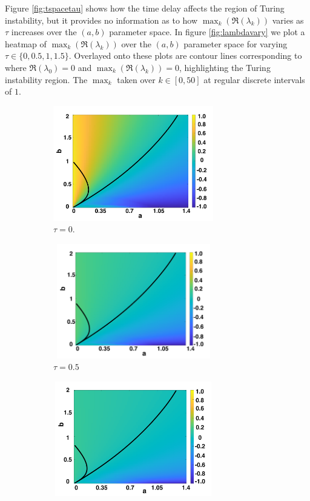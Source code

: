 Figure \ref{fig:tspacetau} shows how the time delay affects the region of Turing instability, but it provides no information as to how $\max_k(\Re(\lambda_k))$ varies as $\tau$ increases over the $(a,b)$ parameter space. In figure \ref{fig:lambdavary} we plot a heatmap of $\max_k(\Re(\lambda_k))$ over the $(a,b)$ parameter space for varying $\tau\in\{0,0.5,1,1.5\}$. Overlayed onto these plots are contour lines corresponding to where $\Re(\lambda_0)=0$ and $\max_k(\Re(\lambda_k))=0$, highlighting the Turing instability region. The $\max_k$ taken over $k\in[0,50]$ at regular discrete intervals of $1$.
\begin{figure}[H]
    \centering
    \begin{subfigure}[b]{0.45\textwidth}
        \centering
        \includegraphics[width=7cm,height=5cm]{tau0bif.png}
        \caption{$\tau=0$.}
        \label{}
    \end{subfigure}
    \hfill
    \begin{subfigure}[b]{0.45\textwidth}
        \centering
        \includegraphics[width=7cm,height=5cm]{tau05bif.png}
        \caption{$\tau=0.5$}
        \label{}
    \end{subfigure}
    \hfill
    \begin{subfigure}[b]{0.45\textwidth}
        \centering
        \includegraphics[width=7cm,height=5cm]{tau1bif.png}

\end{subfigure}
\end{figure}
